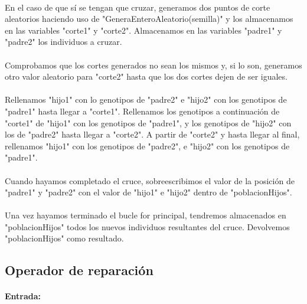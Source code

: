 	\paragraph{}En el caso de que sí se tengan que cruzar, generamos dos puntos de corte aleatorios haciendo uso de "GeneraEnteroAleatorio(semilla)" y los almacenamos en las variables "corte1" y "corte2". Almacenamos en las variables "padre1" y "padre2" los individuos a cruzar.
	
	\paragraph{}Comprobamos que los cortes generados no sean los mismos y, si lo son, generamos otro valor aleatorio para "corte2" hasta que los dos cortes dejen de ser iguales.
	
	\paragraph{}Rellenamos "hijo1" con lo genotipos de "padre2" e "hijo2" con los genotipos de "padre1" hasta llegar a "corte1". Rellenamos los genotipos a continuación de "corte1" de "hijo1" con los genotipos de "padre1", y los genotipos de "hijo2" con los de "padre2" hasta llegar a "corte2". A partir de "corte2" y hasta llegar al final, rellenamos "hijo1" con los genotipos de "padre2", e "hijo2" con los genotipos de "padre1".
	
	\paragraph{}Cuando hayamos completado el cruce, sobreescribimos el valor de la posición de "padre1" y "padre2" con el valor de "hijo1" e "hijo2" dentro de  "poblacionHijos". 
	
	\paragraph{}Una vez hayamos terminado el bucle for principal, tendremos almacenados en "poblacionHijos" todos los nuevos individuos resultantes del cruce. Devolvemos "poblacionHijos" como resultado.
	
	\subsection{Operador de reparación}
	
	\paragraph{Entrada:}
	
